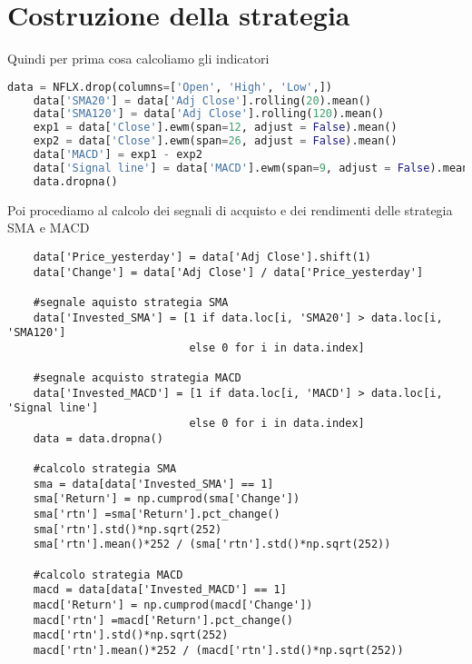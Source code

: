 \documentclass{report}
\begin{document}
\section{Costruzione della strategia}
Quindi per prima cosa calcoliamo gli indicatori
\begin{lstlisting}[language=python]
    data = NFLX.drop(columns=['Open', 'High', 'Low',])
    data['SMA20'] = data['Adj Close'].rolling(20).mean()
    data['SMA120'] = data['Adj Close'].rolling(120).mean()
    exp1 = data['Close'].ewm(span=12, adjust = False).mean()
    exp2 = data['Close'].ewm(span=26, adjust = False).mean()
    data['MACD'] = exp1 - exp2
    data['Signal line'] = data['MACD'].ewm(span=9, adjust = False).mean()
    data.dropna()
\end{lstlisting}
Poi procediamo al calcolo dei segnali di acquisto e dei rendimenti delle strategia SMA e MACD
\begin{lstlisting}
    data['Price_yesterday'] = data['Adj Close'].shift(1)
    data['Change'] = data['Adj Close'] / data['Price_yesterday']
    
    #segnale aquisto strategia SMA
    data['Invested_SMA'] = [1 if data.loc[i, 'SMA20'] > data.loc[i, 'SMA120'] 
                            else 0 for i in data.index]
    
    #segnale acquisto strategia MACD
    data['Invested_MACD'] = [1 if data.loc[i, 'MACD'] > data.loc[i, 'Signal line']
                            else 0 for i in data.index]
    data = data.dropna()
    
    #calcolo strategia SMA
    sma = data[data['Invested_SMA'] == 1]
    sma['Return'] = np.cumprod(sma['Change'])
    sma['rtn'] =sma['Return'].pct_change()
    sma['rtn'].std()*np.sqrt(252)
    sma['rtn'].mean()*252 / (sma['rtn'].std()*np.sqrt(252))
    
    #calcolo strategia MACD
    macd = data[data['Invested_MACD'] == 1]
    macd['Return'] = np.cumprod(macd['Change'])
    macd['rtn'] =macd['Return'].pct_change()
    macd['rtn'].std()*np.sqrt(252)
    macd['rtn'].mean()*252 / (macd['rtn'].std()*np.sqrt(252))
\end{lstlisting}
\end{document}
